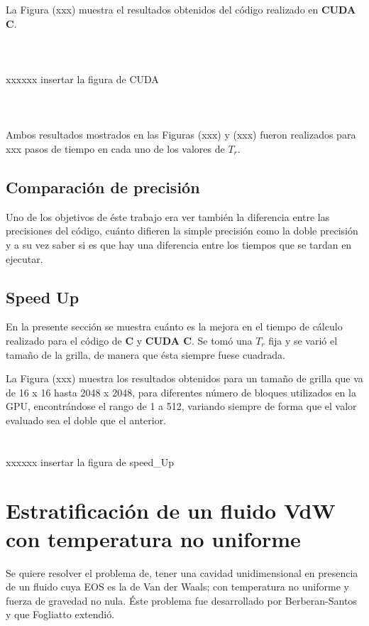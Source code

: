 La Figura (xxx) muestra el resultados obtenidos del código realizado en \textbf{CUDA C}.
\\
\\
\\
\\
xxxxxx insertar la figura de CUDA
\\
\\
\\
\\
Ambos resultados mostrados en las Figuras (xxx) y (xxx) fueron realizados para xxx pasos de tiempo en cada uno de los valores de $T_r$.


\subsection{Comparación de precisión}

Uno de los objetivos de éste trabajo era ver también la diferencia entre las precisiones del código, cuánto difieren la simple precisión como la doble precisión y a su vez saber si es que hay una diferencia entre los tiempos que se tardan en ejecutar.

\subsection{Speed Up}

En la presente sección se muestra cuánto es la mejora en el tiempo de cálculo realizado para el código de \textbf{C} y \textbf{CUDA C}. Se tomó una $T_r$ fija y se varió el tamaño de la grilla, de manera que ésta siempre fuese cuadrada.

La Figura (xxx) muestra los resultados obtenidos para un tamaño de grilla que va de 16 x 16 hasta 2048 x 2048, para diferentes número de bloques utilizados en la GPU, encontrándose el rango de 1 a 512, variando siempre de forma que el valor evaluado sea el doble que el anterior.
\\
\\
\\
xxxxxx insertar la figura de speed\_Up







\section{Estratificación de un fluido VdW con temperatura no uniforme}

Se quiere resolver el problema de, tener una cavidad unidimensional en presencia de un fluido cuya EOS es la de Van der Waals; con temperatura  no uniforme y fuerza de gravedad no nula. Éste problema fue desarrollado por Berberan-Santos \cite{berberan2002liquid} y que Fogliatto \cite{fogliatto2019simulation} extendió. 

